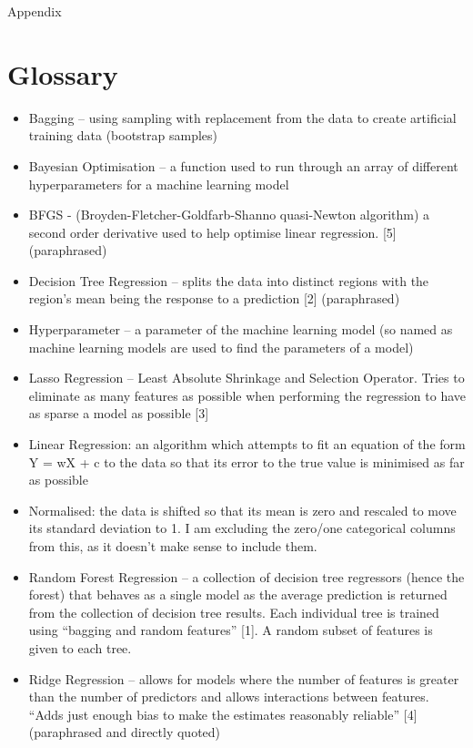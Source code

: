 \documentclass[a4paper,12pt]{article}
\begin{document}
Appendix

\section{Glossary}
\begin{itemize}
	\item Bagging – using sampling with replacement from the data to create artificial training data (bootstrap samples)
	\item Bayesian Optimisation – a function used to run through an array of different hyperparameters for a machine learning model
	\item BFGS - (Broyden-Fletcher-Goldfarb-Shanno quasi-Newton algorithm) a second order derivative used to help optimise linear regression. [5] (paraphrased)
	\item Decision Tree Regression – splits the data into distinct regions with the region’s mean being the response to a prediction [2] (paraphrased)
	\item Hyperparameter – a parameter of the machine learning model (so named as machine learning models are used to find the parameters of a model)
	\item Lasso Regression – Least Absolute Shrinkage and Selection Operator. Tries to eliminate as many features as possible when performing the regression to have as sparse a model as possible [3]
	\item Linear Regression: an algorithm which attempts to fit an equation of the form Y = wX + c to the data so that its error to the true value is minimised as far as possible
	\item Normalised: the data is shifted so that its mean is zero and rescaled to move its standard deviation to 1. I am excluding the zero/one categorical columns from this, as it doesn’t make sense to include them.
	\item Random Forest Regression – a collection of decision tree regressors (hence the forest) that behaves as a single model as the average prediction is returned from the collection of decision tree results. Each individual tree is trained using “bagging and random features” [1]. A random subset of features is given to each tree.
	\item Ridge Regression – allows for models where the number of features is greater than the number of predictors and allows interactions between features. “Adds just enough bias to make the estimates reasonably reliable” [4] (paraphrased and directly quoted) 
\end{itemize}
\end{document}
